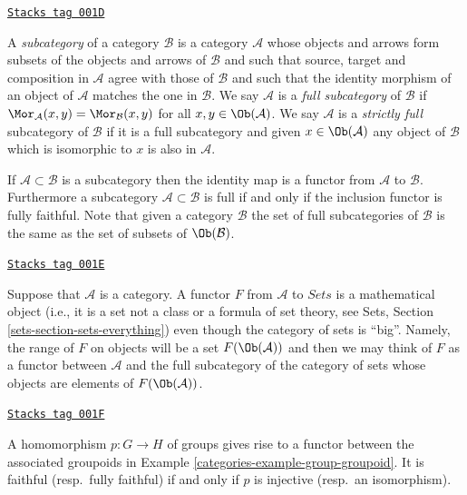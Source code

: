 \begin{definition}[Subcategory]
\label{categories-definition-subcategory}
\href{https://stacks.math.columbia.edu/tag/001D}{\texttt{Stacks tag 001D}}

A {\it subcategory} of a category $\mathcal{B}$ is a category $\mathcal{A}$
whose objects and arrows form subsets of the objects and arrows of $\mathcal{B}$
and such that source, target and composition in $\mathcal{A}$ agree with those
of $\mathcal{B}$ and such that the identity morphism of an object of
$\mathcal{A}$ matches the one in $\mathcal{B}$. We say $\mathcal{A}$ is a
{\it full subcategory} of $\mathcal{B}$ if $\Mor_\mathcal{A}(x, y)
= \Mor_\mathcal{B}(x, y)$ for all $x, y \in \Ob(\mathcal{A})$.
We say $\mathcal{A}$ is a {\it strictly full} subcategory of $\mathcal{B}$
if it is a full subcategory and given $x \in \Ob(\mathcal{A})$ any
object of $\mathcal{B}$ which is isomorphic to $x$ is also in $\mathcal{A}$.
\end{definition}

If $\mathcal{A} \subset \mathcal{B}$ is a subcategory then the
identity map is a functor from $\mathcal{A}$ to $\mathcal{B}$.
Furthermore a subcategory $\mathcal{A} \subset \mathcal{B}$
is full if and only if the inclusion functor is fully faithful.
Note that given a category $\mathcal{B}$ the set of full subcategories
of $\mathcal{B}$ is the same as the set of subsets of
$\Ob(\mathcal{B})$.

\begin{remark}
\label{categories-remark-functor-into-sets}
\href{https://stacks.math.columbia.edu/tag/001E}{\texttt{Stacks tag 001E}}

Suppose that $\mathcal{A}$ is a category.
A functor $F$ from $\mathcal{A}$ to $\textit{Sets}$
is a mathematical object (i.e., it is a set not a class or a formula
of set theory, see
Sets, Section \ref{sets-section-sets-everything})
even though the category of sets is ``big''.
Namely, the range of $F$ on objects will be
a set $F(\Ob(\mathcal{A}))$ and then we
may think of $F$ as a functor between
$\mathcal{A}$ and the full subcategory
of the category of sets whose
objects are elements of $F(\Ob(\mathcal{A}))$.
\end{remark}

\begin{example}
\label{categories-example-group-homomorphism-functor}
\href{https://stacks.math.columbia.edu/tag/001F}{\texttt{Stacks tag 001F}}

A homomorphism $p : G\to H$ of groups gives rise to a functor
between the associated groupoids in Example \ref{categories-example-group-groupoid}. It is
faithful (resp.\ fully faithful) if and only if $p$ is injective (resp.\ an
isomorphism).
\end{example}

